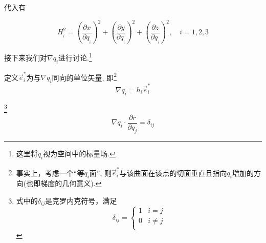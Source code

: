 代入有

\begin{corollary}
    \begin{equation}
        H_{_i}^{2}=\left( \frac{\partial x}{\partial q_{_i}} \right) ^2+\left( \frac{\partial y}{\partial q_{_i}} \right) ^2+\left( \frac{\partial z}{\partial q_{_i}} \right) ^2,\quad i=1,2,3
    \end{equation}
\end{corollary}

接下来我们对$\nabla q_i$进行讨论.\footnote{这里将$q_i$视为空间中的标量场.}

\begin{definition}
    定义$\vec e_i^*$为与$\nabla q_i$同向的单位矢量, 即\footnote{事实上，考虑一个“等$q_i$面”, 则$\vec e_i^*$与该曲面在该点的切面垂直且指向$q_i$增加的方向(也即梯度的几何意义).}
    \begin{equation}
        \nabla q_i = h_i\vec e_i^*\label{eq2}
    \end{equation}
\end{definition}

\begin{theorem}\footnote{式中的$\delta _{ij}$是克罗内克符号，满足$$\delta _{ij}=\begin{cases}1&i=j\\0&i\ne j\\\end{cases}$$}
    \begin{equation}
        \nabla q_i\cdot \frac{\partial r}{\partial q_j}=\delta _{ij} \label{eq}
    \end{equation}
\end{theorem}

